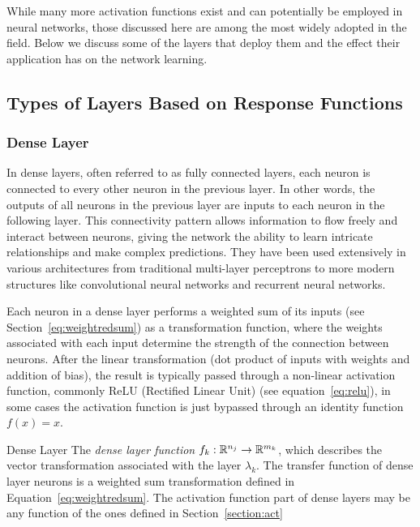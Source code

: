 While many more activation functions exist and can potentially be employed in neural networks, those discussed here are among the most widely adopted in the field. Below we discuss some of the layers that deploy them and the effect their application has on the network learning. 

\subsection{Types of Layers Based on Response Functions}

\subsubsection{Dense Layer}
\label{section:dense}
In dense layers, often referred to as fully connected layers, each neuron is connected to every other neuron in the previous layer. In other words, the outputs of all neurons in the previous layer are inputs to each neuron in the following layer. This connectivity pattern allows information to flow freely and interact between neurons, giving the network the ability to learn intricate relationships and make complex predictions. They have been used extensively in various architectures from traditional multi-layer perceptrons to more modern structures like convolutional neural networks and recurrent neural networks.

Each neuron in a dense layer performs a weighted sum of its inputs (see Section~\ref{eq:weightredsum}) as a transformation function, where the weights associated with each input determine the strength of the connection between neurons. After the linear transformation (dot product of inputs with weights and addition of bias), the result is typically passed through a non-linear activation function, commonly ReLU (Rectified Linear Unit) (see equation~\eqref{eq:relu}), in some cases the activation function is just bypassed through an identity function $f(x) = x$.

\begin{Definition}{Dense Layer}{}
The \emph{dense layer function} $f_k:\mathbb{R}^{n_j}\to \mathbb{R}^{m_k}$, which describes the vector transformation associated with the layer $\lambda_k$. The transfer function of dense layer neurons is a weighted sum transformation defined in Equation~\eqref{eq:weightredsum}. The activation function part of dense layers may be any function of the ones defined in Section~\ref{section:act}
\end{Definition}

